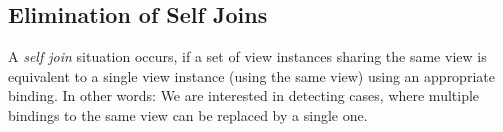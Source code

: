 \documentclass[a4paper,twoside,bibtotoc,abstracton,12pt,BCOR=15mm]{scrreprt}
\newcommand{\todo}[1]{\textbf{ToDo: \textit{#1}}}
\begin{document}
   



\subsection{Elimination of Self Joins}
A \emph{self join} situation occurs, if a set of view instances sharing the same view
is equivalent to a single view instance (using the same view) using an appropriate binding.
In other words: We are interested in detecting cases, where multiple bindings to the same view can be replaced by a single one.
\end{document}
